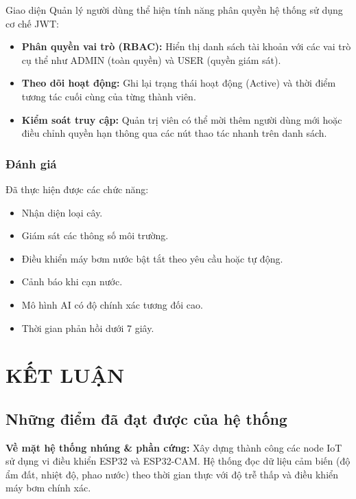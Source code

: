 \documentclass[12pt,a4paper]{report}
\begin{document}
Giao diện Quản lý người dùng thể hiện tính năng phân quyền hệ thống sử dụng cơ chế JWT:
\begin{itemize}
    \item \textbf{Phân quyền vai trò (RBAC):} Hiển thị danh sách tài khoản với các vai trò cụ thể như ADMIN (toàn quyền) và USER (quyền giám sát).
    \item \textbf{Theo dõi hoạt động:} Ghi lại trạng thái hoạt động (Active) và thời điểm tương tác cuối cùng của từng thành viên.
    \item \textbf{Kiểm soát truy cập:} Quản trị viên có thể mời thêm người dùng mới hoặc điều chỉnh quyền hạn thông qua các nút thao tác nhanh trên danh sách.
\end{itemize}

\subsection{Đánh giá}

Đã thực hiện được các chức năng:

\begin{itemize}
    \item Nhận diện loại cây.
    \item Giám sát các thông số môi trường.
    \item Điều khiển máy bơm nước bật tắt theo yêu cầu hoặc tự động.
    \item Cảnh báo khi cạn nước.
    \item Mô hình AI có độ chính xác tương đối cao.
    \item Thời gian phản hồi dưới 7 giây.
\end{itemize}

\chapter{KẾT LUẬN}

\section{Những điểm đã đạt được của hệ thống}

\textbf{Về mặt hệ thống nhúng \& phần cứng:} Xây dựng thành công các node IoT
sử dụng vi điều khiển ESP32 và ESP32-CAM. Hệ thống đọc dữ liệu cảm biến (độ
ẩm đất, nhiệt độ, phao nước) theo thời gian thực với độ trễ thấp và điều
khiển máy bơm chính xác.
\end{document}
